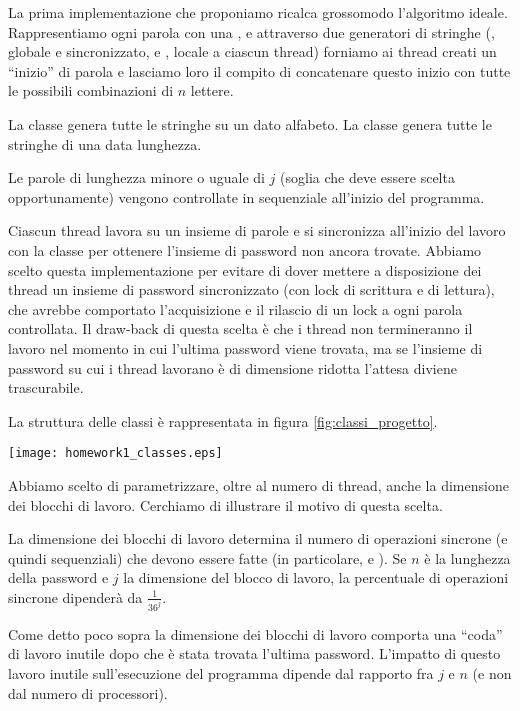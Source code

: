 \documentclass[]{myarticle}
\begin{document}
La prima implementazione che proponiamo ricalca grossomodo l'algoritmo ideale.
Rappresentiamo ogni parola con una , e attraverso due generatori di stringhe (, globale e sincronizzato, e , locale a ciascun thread) forniamo ai thread creati un ``inizio'' di parola e lasciamo loro il compito di concatenare questo inizio con tutte le possibili combinazioni di $n$ lettere.

La classe  genera tutte le stringhe su un dato alfabeto.
La classe  genera tutte le stringhe di una data lunghezza.

Le parole di lunghezza minore o uguale di $j$ (soglia che deve essere scelta opportunamente) vengono controllate in sequenziale all'inizio del programma.

Ciascun thread lavora su un insieme di parole e si sincronizza all'inizio del lavoro con la classe  per ottenere l'insieme di password non ancora trovate.
Abbiamo scelto questa implementazione per evitare di dover mettere a disposizione dei thread un insieme di password sincronizzato (con lock di scrittura e di lettura), che avrebbe comportato l'acquisizione e il rilascio di un lock a ogni parola controllata.
Il draw-back di questa scelta \`e che i thread non termineranno il lavoro nel momento in cui l'ultima password viene trovata, ma se l'insieme di password su cui i thread lavorano \`e di dimensione ridotta l'attesa diviene trascurabile.

La struttura delle classi \`e rappresentata in figura \ref{fig:classi_progetto}.

\begin{figure*}[th]
	\centering
	\texttt{[image: homework1\_classes.eps]}
	\caption{Struttura delle classi del progetto.}
	\label{fig:classi_progetto}
\end{figure*}

Abbiamo scelto di parametrizzare, oltre al numero di thread, anche la dimensione dei blocchi di lavoro.
Cerchiamo di illustrare il motivo di questa scelta.

La dimensione dei blocchi di lavoro determina il numero di operazioni sincrone (e quindi sequenziali) che devono essere fatte (in particolare,  e ).
Se $n$ \`e la lunghezza della password e $j$ la dimensione del blocco di lavoro, la percentuale di operazioni sincrone dipender\`a da $\frac{1}{36^j}$.

Come detto poco sopra la dimensione dei blocchi di lavoro comporta una ``coda'' di lavoro inutile dopo che \`e stata trovata l'ultima password.
L'impatto di questo lavoro inutile sull'esecuzione del programma dipende dal rapporto fra $j$ e $n$ (e non dal numero di processori).
\end{document}
